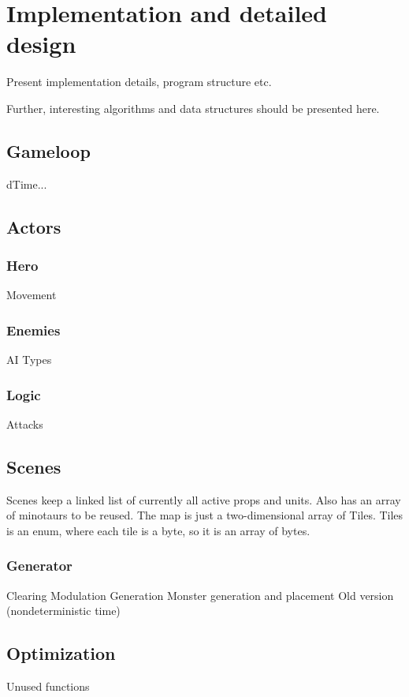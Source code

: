 \chapter{Implementation and detailed design}

Present implementation details, program structure etc.

Further, interesting algorithms and data structures should be presented here.

\section{Gameloop}
dTime...\\

\section{Actors}
\subsection{Hero}
Movement
\subsection{Enemies}
AI
Types

\subsection{Logic}
Attacks

\section{Scenes}
Scenes keep a linked list of currently all active props and units.
Also has an array of minotaurs to be reused.
The map is just a two-dimensional array of Tiles. Tiles is an enum, where each tile is a byte, so it is an array of bytes.
\subsection{Generator}

Clearing
Modulation
Generation
Monster generation and placement
Old version (nondeterministic time)

\section{Optimization}
Unused functions

